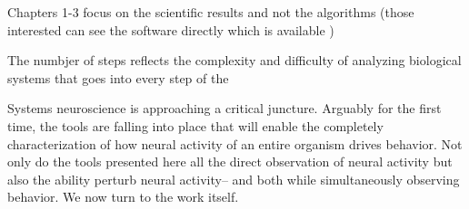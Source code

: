Chapters 1-3 focus on the scientific results and not the algorithms (those interested can see the software directly which is available )

The numbjer of steps reflects the complexity and difficulty of analyzing biological systems that goes into every step of the 





Systems neuroscience is approaching  a critical juncture. Arguably for the first time, the tools are falling into place that will enable the  completely characterization of how  neural activity of an entire organism drives behavior. Not only  do the tools presented here all the direct observation of neural activity but also the ability perturb neural activity-- and both while simultaneously observing behavior. We now turn to the work itself.


